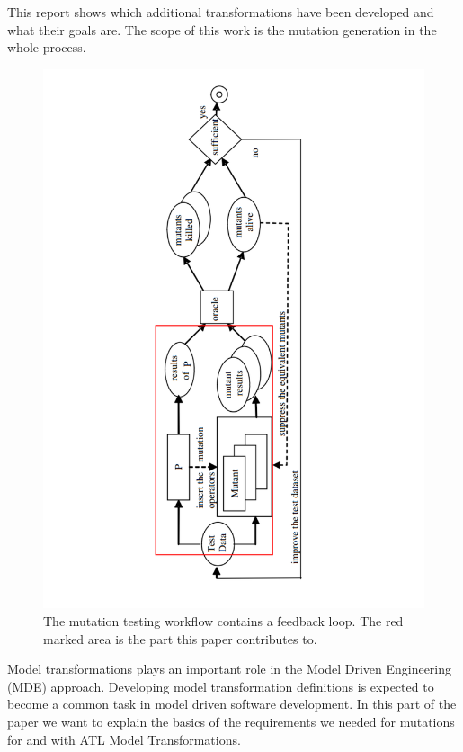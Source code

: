 \documentclass{llncs}
\begin{document}
This report shows which additional transformations have been developed and what their goals are. The scope of this work is the mutation generation in the whole process.

\begin{figure}
	\centering
	\includegraphics[angle=270,width=1\textwidth]{figures/Marked_Mutation_Process.pdf}
	\caption{The mutation testing workflow contains a feedback loop. The red marked area is the part this paper contributes to.\cite{MatMottu2006}}
	\label{fig:Marked_Mutation_Process}
\end{figure}

Model transformations plays an important role in the Model Driven Engineering
(MDE) approach. Developing model transformation definitions is expected to
become a common task in model driven software development. \cite{atl:frederic}
In this part of the paper we want to explain the basics of the requirements we needed for mutations for and with ATL Model Transformations.
\end{document}
